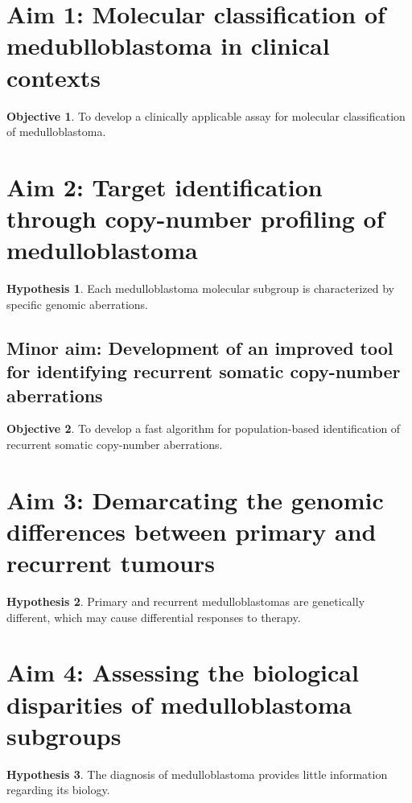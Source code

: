 \documentclass[11pt,letterpaper]{article}
\theoremstyle{definition}
\newtheorem*{hypothesis}{Hypothesis}
\newtheorem*{objective}{Objective}
\begin{document}

\section{Aim 1: Molecular classification of medublloblastoma in clinical contexts}

\begin{objective}
To develop a clinically applicable assay for molecular classification of medulloblastoma.
\end{objective}

\section{Aim 2: Target identification through copy-number profiling of medulloblastoma}

\begin{hypothesis}
Each medulloblastoma molecular subgroup is characterized by specific genomic aberrations.
\end{hypothesis}

\subsection{Minor aim: Development of an improved tool for identifying recurrent somatic copy-number aberrations}

\begin{objective}
To develop a fast algorithm for population-based identification of recurrent somatic copy-number aberrations.
\end{objective}

\section{Aim 3: Demarcating the genomic differences between primary and recurrent tumours}

\begin{hypothesis}
Primary and recurrent medulloblastomas are genetically different, which may cause differential responses to therapy.
\end{hypothesis}

\section{Aim 4: Assessing the biological disparities of medulloblastoma subgroups}

\begin{hypothesis}
The diagnosis of medulloblastoma provides little information regarding its biology.
\end{hypothesis}
\end{document}
